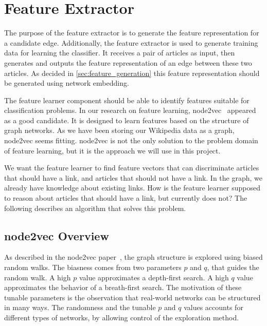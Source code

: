 \section{Feature Extractor}
The purpose of the feature extractor is to generate the feature representation for a candidate edge. Additionally, the feature extractor is used to generate training data for learning the classifier. It receives a pair of articles as input, then generates and outputs the feature representation of an edge between these two articles. As decided in \cref{sec:feature_generation} this feature representation should be generated using network embedding.




The feature learner component should be able to identify features suitable for classification problems. In our research on feature learning, node2vec~\cite{node2vec} appeared as a good candidate. It is designed to learn features based on the structure of graph networks. As we have been storing our Wikipedia data as a graph, node2vec seems fitting. node2vec is not the only solution to the problem domain of feature learning, but it is the approach we will use in this project.

We want the feature learner to find feature vectors that can discriminate articles that should have a link, and articles that should not have a link. In the graph, we already have knowledge about existing links. How is the feature learner supposed to reason about articles that should have a link, but currently does not? The following describes an algorithm that solves this problem.

\subsection{node2vec Overview}
As described in the node2vec paper~\cite{node2vec}, the graph structure is explored using biased random walks. The biasness comes from two parameters $p$ and $q$, that guides the random walk. A high $p$  value approximates a depth-first search. A high $q$  value approximates the behavior of a breath-first search. The motivation of these tunable parameters is the observation that real-world networks can be structured in many ways. The randomness and the tunable $p$ and $q$ values accounts for different types of networks, by allowing control of the exploration method.

